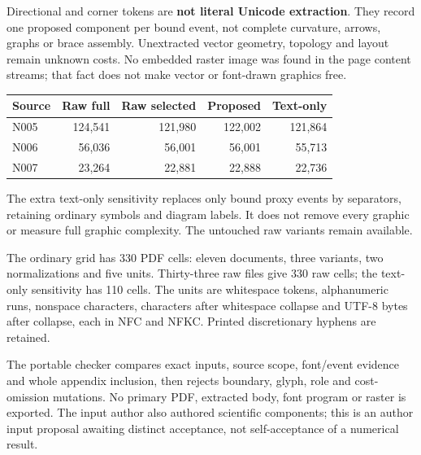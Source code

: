\documentclass[11pt,a4paper]{article}
\begin{document}
Directional and corner tokens are \textbf{not literal Unicode extraction}. They record one proposed component per bound event, not complete curvature, arrows, graphs or brace assembly. Unextracted vector geometry, topology and layout remain unknown costs. No embedded raster image was found in the page content streams; that fact does not make vector or font-drawn graphics free.
\begin{center}\begin{tabular}{lrrrr}\toprule
Source & Raw full & Raw selected & Proposed & Text-only\\\midrule
N005 & 124,541 & 121,980 & 122,002 & 121,864\\
N006 & 56,036 & 56,001 & 56,001 & 55,713\\
N007 & 23,264 & 22,881 & 22,888 & 22,736\\
\bottomrule\end{tabular}\end{center}
The extra text-only sensitivity replaces only bound proxy events by separators, retaining ordinary symbols and diagram labels. It does not remove every graphic or measure full graphic complexity. The untouched raw variants remain available.

The ordinary grid has 330 PDF cells: eleven documents, three variants, two normalizations and five units. Thirty-three raw files give 330 raw cells; the text-only sensitivity has 110 cells. The units are whitespace tokens, alphanumeric runs, nonspace characters, characters after whitespace collapse and UTF-8 bytes after collapse, each in NFC and NFKC. Printed discretionary hyphens are retained.

The portable checker compares exact inputs, source scope, font/event evidence and whole appendix inclusion, then rejects boundary, glyph, role and cost-omission mutations. No primary PDF, extracted body, font program or raster is exported. The input author also authored scientific components; this is an author input proposal awaiting distinct acceptance, not self-acceptance of a numerical result.
\end{document}

